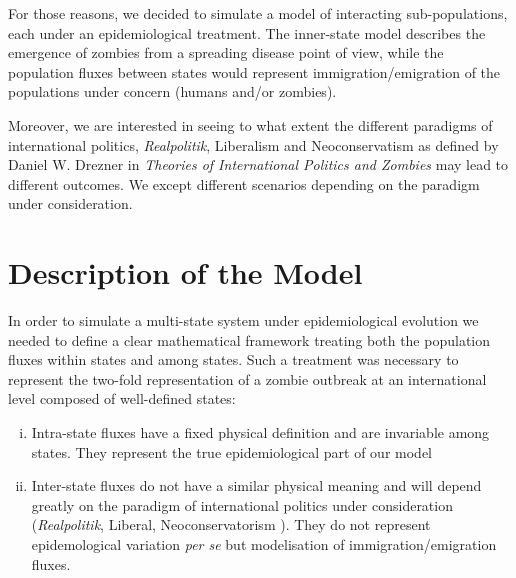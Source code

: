 \documentclass[11pt]{article} %
\begin{document}
For those reasons, we decided to simulate a model of interacting sub-populations, each under an epidemiological treatment. The inner-state model describes the emergence of zombies from a spreading disease point of view, while the population fluxes between states would represent immigration/emigration of the populations under concern (humans and/or zombies). 

Moreover, we are interested in seeing to what extent the different paradigms of international politics, \textit{Realpolitik}, Liberalism and Neoconservatism as defined by Daniel W. Drezner in \textit{Theories of International Politics and Zombies} \cite{drezner} may lead to different outcomes. We except different scenarios depending on the paradigm under consideration. 

\newpage
\section{Description of the Model}\indent

In order to simulate a multi-state system under epidemiological evolution we needed to define a clear mathematical framework treating both the population fluxes within states and among states. Such a treatment was necessary to represent the two-fold representation of a zombie outbreak at an international level composed of well-defined states:
\begin{enumerate}[i.]
	\item Intra-state fluxes have a fixed physical definition and are invariable among states. They represent the true epidemiological part of our model
	\item Inter-state fluxes do not have a similar physical meaning and will depend greatly on the paradigm of international politics under consideration (\textit{Realpolitik}, Liberal, Neoconservatorism  \cite{drezner}). They do not represent epidemological variation \textit{per se} but modelisation of immigration/emigration fluxes.
\end{enumerate}
\end{document}
